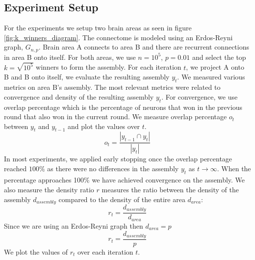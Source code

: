 \documentclass{article}
\begin{document}
\subsection{Experiment Setup}
For the experiments we setup two brain areas as seen in figure \ref{fig:k_winners_diagram}. The connectome is modeled using an Erdos-Reyni graph, $G_{n,p}$. Brain area A connects to area B and there are recurrent connections in  area B onto itself. For both areas, we use $n = 10^5$, $p=0.01$ and select the top $k = \sqrt{10^5}$ winners to form the assembly. For each iteration $t$, we project A onto B and B onto itself, we evaluate the resulting assembly $y_t$. 
We measured various metrics on area B's assembly. The most relevant metrics were related to convergence and density of the resulting assembly $y_t$. For convergence, we use overlap percentage which is the percentage of neurons that won in the previous round that also won in the current round. We measure overlap percentage $o_t$ between $y_t$ and $y_{t-1}$ and plot the values over $t$.
$$ o_t = \frac{|y_{t-1} \cap y_t|}{|y_t|}$$
In most experiments, we applied early stopping once the overlap percentage reached $100\%$ as there were no differences in the assembly $y_t$ as $t \xrightarrow[]{} \infty$. When the percentage approaches 100\% we have achieved convergence on the assembly. We also measure the density ratio $r$ measures the ratio between the density of the assembly $d_{assembly}$ compared to the density of the entire area $d_{area}$:
$$ r_t = \frac{d_{assembly}}{d_{area}}$$
Since we are using an Erdos-Reyni graph then $d_{area} = p$
$$ r_t = \frac{d_{assembly}}{p}$$
We plot the values of $r_t$ over each iteration $t$.
\end{document}
